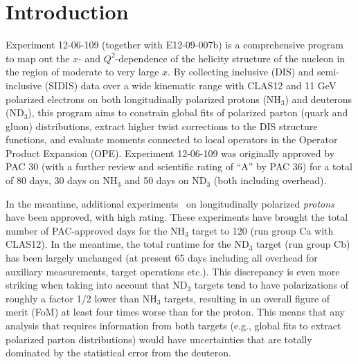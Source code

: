 \section{Introduction}

Experiment 12-06-109 (together with E12-09-007b) is a comprehensive program to map out the $x$- and $Q^2$-dependence of the helicity structure of the nucleon in the region of moderate to very large $x$. By collecting inclusive (DIS) and semi-inclusive (SIDIS) data over a wide kinematic range with CLAS12 and 11 GeV polarized electrons on both longitudinally polarized protons (NH$_3$) and deuterons (ND$_3$), this program aims to constrain global fits of polarized parton (quark and gluon) distributions, extract higher twist corrections to the DIS structure functions, and evaluate moments connected to local operators in the Operator Product Expansion (OPE). 
Experiment 12-06-109 was originally approved by PAC 30 (with a further review and scientific rating of ``A'' by PAC 36) for a total of 80 days, 30 days on NH$_3$ and 50 days on ND$_3$ (both including overhead).

In the meantime, additional experiments~\cite{RGC} on longitudinally polarized {\em protons} have been approved, with high rating. These experiments have brought the total number of PAC-approved days for the NH$_3$ target to 120 (run group Ca with CLAS12). 
In the meantime, the total runtime for the ND$_3$ target (run group Cb) has been largely unchanged (at present 65 days including all overhead for auxiliary measurements, target operations etc.). This discrepancy is even more striking when taking into account that ND$_3$ targets tend to have polarizations of roughly a factor 1/2 lower than NH$_3$ targets, resulting in an overall figure of merit (FoM) at least four times worse than for the proton. This means that any  analysis that requires information from both targets (e.g., global fits to extract polarized parton distributions) would have uncertainties that are totally dominated by the statistical error from the deuteron.

